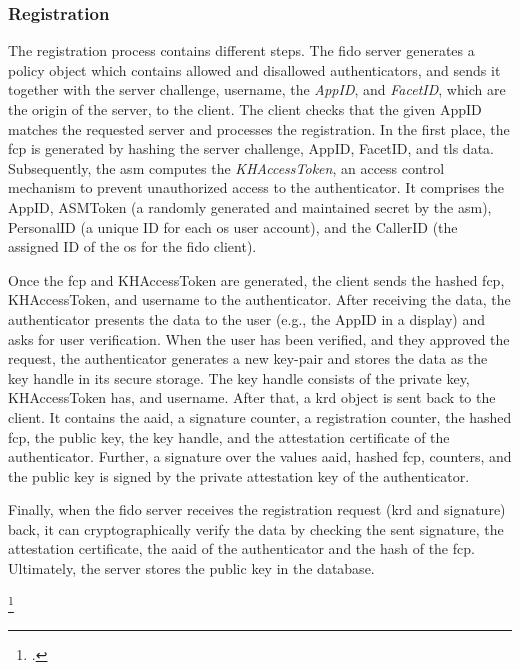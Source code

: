 \subsubsection{Registration}

The registration process contains different steps. The \gls{fido} server generates a policy object which contains allowed and disallowed authenticators, and sends it together with the server challenge, username, the \textit{AppID}, and \textit{FacetID}, which are the origin of the server, to the client. The client checks that the given AppID matches the requested server and processes the registration. In the first place, the \gls{fcp} is generated by hashing the server challenge, AppID, FacetID, and \gls{tls} data. Subsequently, the \gls{asm} computes the \textit{KHAccessToken}, an access control mechanism to prevent unauthorized access to the authenticator. It comprises the AppID, ASMToken (a randomly generated and maintained secret by the \gls{asm}), PersonalID (a unique ID for each \gls{os} user account), and the CallerID (the assigned ID of the \gls{os} for the \gls{fido} client).

Once the \gls{fcp} and KHAccessToken are generated, the client sends the hashed \gls{fcp}, KHAccessToken, and username to the authenticator. After receiving the data, the authenticator presents the data to the user (e.g., the AppID in a display) and asks for user verification. When the user has been verified, and they approved the request, the authenticator generates a new key-pair and stores the data as the key handle in its secure storage. The key handle consists of the private key, KHAccessToken has, and username. After that, a \gls{krd} object is sent back to the client. It contains the \gls{aaid}, a signature counter, a registration counter, the hashed \gls{fcp}, the public key, the key handle, and the attestation certificate of the authenticator. Further, a signature over the values \gls{aaid}, hashed \gls{fcp}, counters, and the public key is signed by the private attestation key of the authenticator.

Finally, when the \gls{fido} server receives the registration request (\gls{krd} and signature) back, it can cryptographically verify the data by checking the sent signature, the attestation certificate, the \gls{aaid} of the authenticator and the hash of the \gls{fcp}. Ultimately, the server stores the public key in the database.

\footcites[See][191]{7897543}[See][131]{10.1007/978-3-319-67639-5_11}[See][]{uaf-asm}

